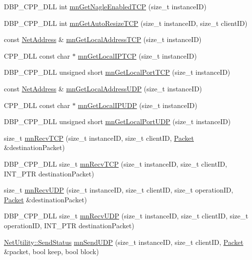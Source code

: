 \begin{DoxyCompactItemize}
\item 
DBP\_\-CPP\_\-DLL int \hyperlink{group__proc_commands_gac6751902ccefd2b24eee546fd460be86}{mnGetNagleEnabledTCP} (size\_\-t instanceID)
\item 
DBP\_\-CPP\_\-DLL int \hyperlink{group__proc_commands_gae6916f4b04f5c6dbf2c526216ee43c75}{mnGetAutoResizeTCP} (size\_\-t instanceID, size\_\-t clientID)
\item 
const \hyperlink{class_net_address}{NetAddress} \& \hyperlink{group__proc_commands_ga191660f11ab55ff6d765d0553b60be78}{mnGetLocalAddressTCP} (size\_\-t instanceID)
\item 
CPP\_\-DLL const char $\ast$ \hyperlink{group__proc_commands_ga5d79d6e116438ddfb76d186f112509c2}{mnGetLocalIPTCP} (size\_\-t instanceID)
\item 
DBP\_\-CPP\_\-DLL unsigned short \hyperlink{group__proc_commands_gad1489b71e71452d1008815c282145a7b}{mnGetLocalPortTCP} (size\_\-t instanceID)
\item 
const \hyperlink{class_net_address}{NetAddress} \& \hyperlink{group__proc_commands_gad78bd1aa3310f998f352a05bd3f26d1e}{mnGetLocalAddressUDP} (size\_\-t instanceID)
\item 
CPP\_\-DLL const char $\ast$ \hyperlink{group__proc_commands_ga3232bef18bae4df9acf445f07eef4610}{mnGetLocalIPUDP} (size\_\-t instanceID)
\item 
DBP\_\-CPP\_\-DLL unsigned short \hyperlink{group__proc_commands_ga3f2ea3393ca3f246eae575484c5e7957}{mnGetLocalPortUDP} (size\_\-t instanceID)
\item 
size\_\-t \hyperlink{group__proc_commands_gaa7714c849a1a3502d9d98aeffe64cbc5}{mnRecvTCP} (size\_\-t instanceID, size\_\-t clientID, \hyperlink{class_packet}{Packet} \&destinationPacket)
\item 
DBP\_\-CPP\_\-DLL size\_\-t \hyperlink{group__proc_commands_ga14e48459c282befe5eb44fc07e094796}{mnRecvTCP} (size\_\-t instanceID, size\_\-t clientID, INT\_\-PTR destinationPacket)
\item 
size\_\-t \hyperlink{group__proc_commands_ga29a3720649b37fa0429c195f8655604d}{mnRecvUDP} (size\_\-t instanceID, size\_\-t clientID, size\_\-t operationID, \hyperlink{class_packet}{Packet} \&destinationPacket)
\item 
DBP\_\-CPP\_\-DLL size\_\-t \hyperlink{group__proc_commands_ga8267c845d7eb86daa604efc9dc317b3c}{mnRecvUDP} (size\_\-t instanceID, size\_\-t clientID, size\_\-t operationID, INT\_\-PTR destinationPacket)
\item 
\hyperlink{class_net_utility_a8051eca61204ffd818281419bbf44736}{NetUtility::SendStatus} \hyperlink{group__proc_commands_ga7be727df70de53051e1952db9a872970}{mnSendUDP} (size\_\-t instanceID, size\_\-t clientID, \hyperlink{class_packet}{Packet} \&packet, bool keep, bool block)

\end{DoxyCompactItemize}
